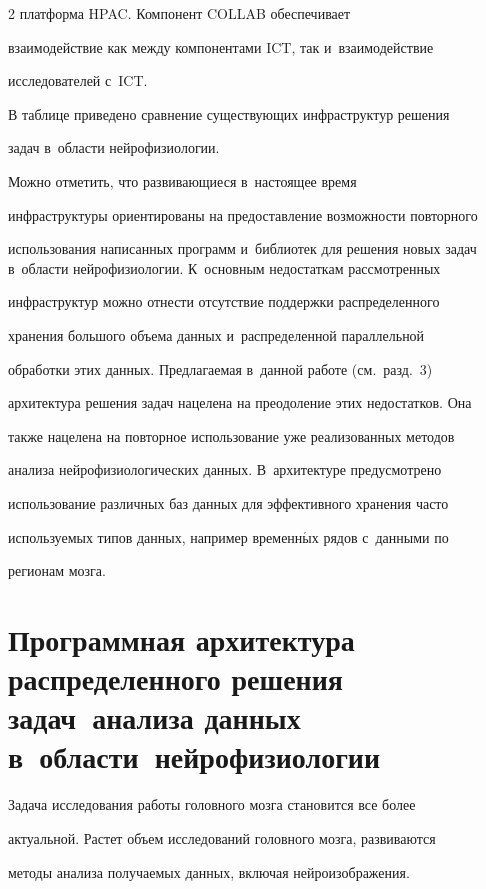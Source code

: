 \begin{multicols}{2}
платформа HPAC. Компонент \mbox{COLLAB} обеспечивает 

взаимодействие как между компонентами ICT, так и~взаимодействие 

исследователей с~ICT.

    

    В таблице приведено сравнение существующих инфраструктур решения 

задач в~области нейрофизиологии.





    

    Можно отметить, что развивающиеся в~настоящее время 

инфраструктуры ориентированы на предостав\-ле\-ние возможности повторного 

использования написанных программ и~библиотек для решения новых задач в~области нейрофизиологии. К~основным недостаткам рассмотренных 

инфраструктур можно отнести отсутствие поддержки распределенного 

хранения большого объема данных и~распределенной параллельной 

обработки этих данных. Предлагаемая в~данной работе (см.\ разд.~3) 

архитектура решения задач нацелена на преодоление этих недостатков. Она 

также нацелена на повторное использование уже реализованных методов 

анализа нейрофизиологических данных. В~архитектуре предусмотрено 

использование различных баз данных для эффективного хранения часто 

используемых типов данных, например временн$\acute{\mbox{ы}}$х рядов с~данными по 

регионам мозга.



\section{Программная архитектура распределенного решения задач~анализа данных в~области~нейрофизиологии}



    Задача исследования работы головного мозга становится все более 

актуальной. Растет объем исследований головного мозга, развиваются 

методы анализа получаемых данных, включая ней\-ро\-изоб\-ра\-же\-ния. 


\end{multicols}
